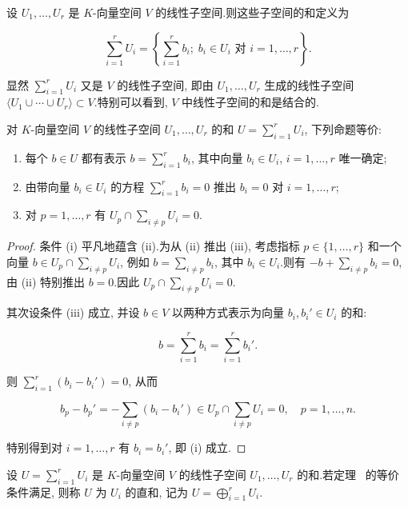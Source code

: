 \begin{definition}[和]\label{def:1.6.1}
设 $U_1, \ldots, U_r$ 是 $K$-向量空间 $V$ 的线性子空间.则这些子空间的和定义为

\[
\sum_{i = 1}^{r} U_i = \left\{\sum_{i = 1}^{r} b_i;\; b_i \in U_i \text{ 对 } i = 1, \ldots, r\right\}\text{.}
\]
\end{definition}

显然 $\sum_{i = 1}^{r} U_i$ 又是 $V$ 的线性子空间, 即由 $U_1, \ldots, U_r$ 生成的线性子空间 $\langle U_1 \cup \cdots \cup U_r \rangle \subset V$.特别可以看到, $V$ 中线性子空间的和是结合的.

\begin{theorem}[直和的刻画]\label{thm:1.6.2}
对 $K$-向量空间 $V$ 的线性子空间 $U_1, \ldots, U_r$ 的和 $U = \sum_{i = 1}^{r} U_i$, 下列命题等价:
\begin{enumerate}
\item[(i)] 每个 $b \in U$ 都有表示 $b = \sum_{i = 1}^{r} b_i$, 其中向量 $b_i \in U_i$, $i = 1, \ldots, r$ 唯一确定;
\item[(ii)] 由带向量 $b_i \in U_i$ 的方程 $\sum_{i = 1}^{r} b_i = 0$ 推出 $b_i = 0$ 对 $i = 1, \ldots, r$;
\item[(iii)] 对 $p = 1, \ldots, r$ 有 $U_p \cap \sum_{i \neq p} U_i = 0$.
\end{enumerate}
\end{theorem}

\begin{proof}
条件 (i) 平凡地蕴含 (ii).为从 (ii) 推出 (iii), 考虑指标 $p \in \{1, \ldots, r\}$ 和一个向量 $b \in U_p \cap \sum_{i \neq p} U_i$, 例如 $b = \sum_{i \neq p} b_i$, 其中 $b_i \in U_i$.则有 $-b + \sum_{i \neq p} b_i = 0$, 由 (ii) 特别推出 $b = 0$.因此 $U_p \cap \sum_{i \neq p} U_i = 0$.

其次设条件 (iii) 成立, 并设 $b \in V$ 以两种方式表示为向量 $b_i, b_i' \in U_i$ 的和:

\[
b = \sum_{i = 1}^{r} b_i = \sum_{i = 1}^{r} b_i'\text{.}
\]

则 $\sum_{i = 1}^{r} (b_i - b_i') = 0$, 从而

\[
b_p - b_p' = -\sum_{i \neq p} (b_i - b_i') \in U_p \cap \sum_{i \neq p} U_i = 0, \quad p = 1, \ldots, n\text{.}
\]

特别得到对 $i = 1, \ldots, r$ 有 $b_i = b_i'$, 即 (i) 成立.
\end{proof}

\begin{definition}[直和]\label{def:1.6.3}
设 $U = \sum_{i = 1}^{r} U_i$ 是 $K$-向量空间 $V$ 的线性子空间 $U_1, \ldots, U_r$ 的和.若定理~ 的等价条件满足, 则称 $U$ 为 $U_i$ 的直和, 记为 $U = \bigoplus_{i = 1}^{r} U_i$.
\end{definition}

